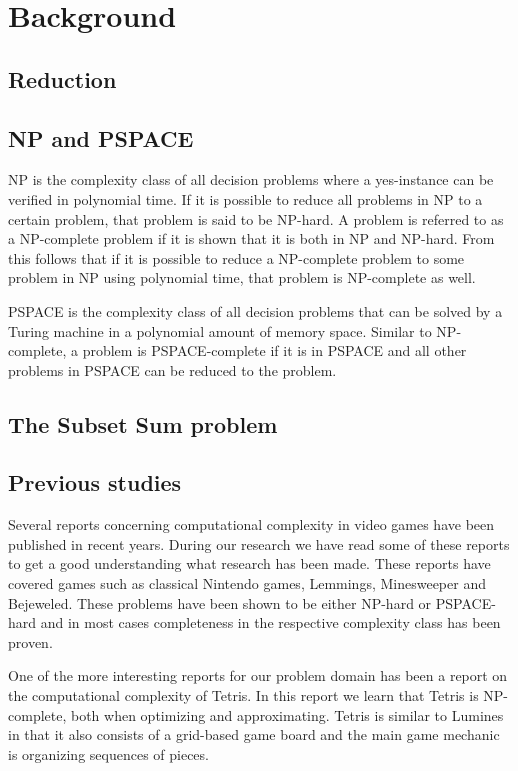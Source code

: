 \section{Background}

\subsection{Reduction}

\subsection{NP and PSPACE}
NP is the complexity class of all decision problems where a yes-instance can be verified in polynomial time. If it is possible to reduce all problems in NP to a certain problem, that problem is said to be NP-hard. A problem is referred to as a NP-complete problem if it is shown that it is both in NP and NP-hard. From this follows that if it is possible to reduce a NP-complete problem to some problem in NP using polynomial time, that problem is NP-complete as well.

PSPACE is the complexity class of all decision problems that can be solved by a Turing machine in a polynomial amount of memory space. Similar to NP-complete, a problem is PSPACE-complete if it is in PSPACE and all other problems in PSPACE can be reduced to the problem.

\subsection{The Subset Sum problem}

\subsection{Previous studies}

Several reports concerning computational complexity in video games have been published in recent years. During our research we have read some of these reports to get a good understanding what research has been made. These reports have covered games such as classical Nintendo games\cite{classic}, Lemmings\cite{lemmings}, Minesweeper\cite{minesweeper} and Bejeweled\cite{candy}. These problems have been shown to be either NP-hard or PSPACE-hard and in most cases completeness in the respective complexity class has been proven.

One of the more interesting reports for our problem domain has been a report on the computational complexity of Tetris. In this report we learn that Tetris is NP-complete,  both when optimizing and approximating. Tetris is similar to Lumines in that it also consists of a grid-based game board and the main game mechanic is organizing sequences of pieces.

